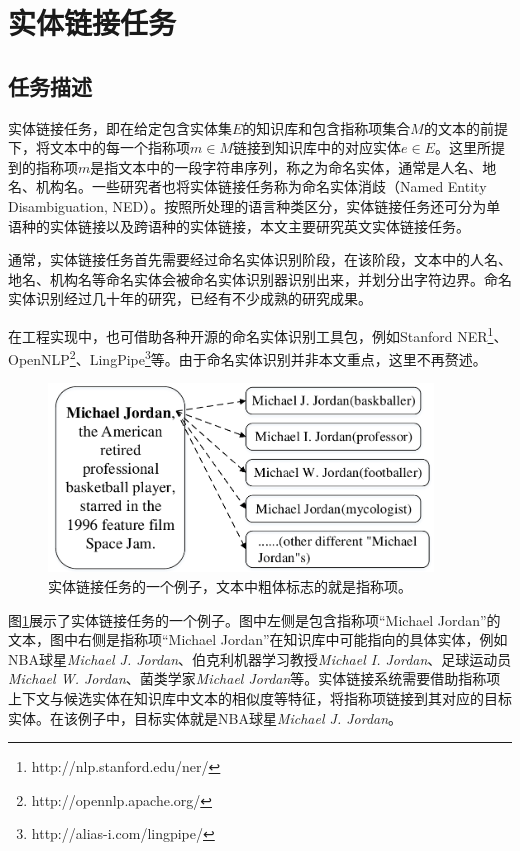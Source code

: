 \section{实体链接任务}
\subsection{任务描述}
实体链接任务，即在给定包含实体集$E$的知识库和包含指称项集合$M$的文本的前提下，将文本中的每一个指称项$m\in M$链接到知识库中的对应实体$e\in E$。这里所提到的指称项$m$是指文本中的一段字符串序列，称之为命名实体，通常是人名、地名、机构名。一些研究者也将实体链接任务称为命名实体消歧（Named Entity Disambiguation, NED）。按照所处理的语言种类区分，实体链接任务还可分为单语种的实体链接以及跨语种的实体链接\cite{CLELBBTM}，本文主要研究英文实体链接任务。

通常，实体链接任务首先需要经过命名实体识别阶段，在该阶段，文本中的人名、地名、机构名等命名实体会被命名实体识别器识别出来，并划分出字符边界。命名实体识别经过几十年的研究，已经有不少成熟的研究成果\cite{RWNERST,NEROEHRTCDA,RHENERCCBEL}。

在工程实现中，也可借助各种开源的命名实体识别工具包，例如Stanford NER\footnote{http://nlp.stanford.edu/ner/}、OpenNLP\footnote{http://opennlp.apache.org/}、LingPipe\footnote{http://alias-i.com/lingpipe/}等。由于命名实体识别并非本文重点，这里不再赘述。

\begin{figure}[!htb]
	\centering\includegraphics[height=5cm]{resource/el_example}
	\caption{实体链接任务的一个例子，文本中粗体标志的就是指称项。}
	\label{fig:el_example}
\end{figure}

图\ref{fig:el_example}展示了实体链接任务的一个例子。图中左侧是包含指称项“Michael Jordan”的文本，图中右侧是指称项“Michael Jordan”在知识库中可能指向的具体实体，例如NBA球星\textit{Michael J. Jordan}、伯克利机器学习教授\textit{Michael I. Jordan}、足球运动员\textit{Michael W. Jordan}、菌类学家\textit{Michael Jordan}等。实体链接系统需要借助指称项上下文与候选实体在知识库中文本的相似度等特征，将指称项链接到其对应的目标实体。在该例子中，目标实体就是NBA球星\textit{Michael J. Jordan}。

